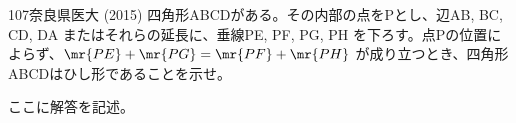 \begin{thm}{107}{}{奈良県医大 (2015)}
 四角形ABCDがある。その内部の点をPとし、辺AB, BC, CD, DA またはそれらの延長に、垂線PE, PF, PG, PH を下ろす。点Pの位置によらず、$\mr{PE}+\mr{PG}=\mr{PF}+\mr{PH}$ が成り立つとき、四角形ABCDはひし形であることを示せ。
\end{thm}

ここに解答を記述。